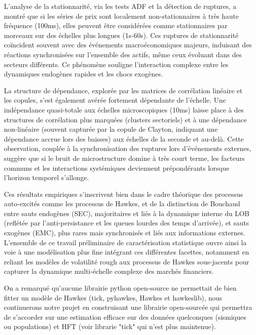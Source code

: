 \documentclass[10pt,a4paper]{article}
\theoremstyle{definition}
\theoremstyle{remark}
\begin{document}
\begin{itemize}
    \vspace{0.5cm}

    L'analyse de la stationnarité, via les tests ADF et la détection de ruptures, a montré que si les séries de prix sont localement non-stationnaires à très haute fréquence (100ms), elles peuvent être considérées comme stationnaires par morceaux sur des échelles plus longues (1s-60s). Ces ruptures de stationnarité coïncident souvent avec des événements macroéconomiques majeurs, induisant des réactions synchronisées sur l'ensemble des actifs, même ceux évoluant dans des secteurs différents. Ce phénomène souligne l'interaction complexe entre les dynamiques endogènes rapides et les chocs exogènes.

    \vspace{0.5cm}

    La structure de dépendance, explorée par les matrices de corrélation linéaire et les copules, s'est également avérée fortement dépendante de l'échelle. Une indépendance quasi-totale aux échelles microscopiques (10ms) laisse place à des structures de corrélation plus marquées (clusters sectoriels) et à une dépendance non-linéaire (souvent capturée par la copule de Clayton, indiquant une dépendance accrue lors des baisses) aux échelles de la seconde et au-delà. Cette observation, couplée à la synchronisation des ruptures lors d'événements externes, suggère que si le bruit de microstructure domine à très court terme, les facteurs communs et les interactions systémiques deviennent prépondérants lorsque l'horizon temporel s'allonge.

    \vspace{0.5cm}

    Ces résultats empiriques s'inscrivent bien dans le cadre théorique des processus auto-excités comme les processus de Hawkes, et de la distinction de Bouchaud entre sauts endogènes (SEC), majoritaires et liés à la dynamique interne du LOB (reflétée par l'anti-persistance et les queues lourdes des temps d'arrivée), et sauts exogènes (EMC), plus rares mais synchronisés et liés aux informations externes. L'ensemble de ce travail préliminaire de caractérisation statistique ouvre ainsi la voie à une modélisation plus fine intégrant ces différentes facettes, notamment en reliant les modèles de volatilité rough aux processus de Hawkes sous-jacents pour capturer la dynamique multi-échelle complexe des marchés financiers.

    \vspace{0.5cm}

    On a remarqué qu'aucune librairie python open-source ne permettait de bien fitter un modèle de Hawkes (tick, pyhawkes, Hawkes et hawkeslib), nous continuerons notre projet en construisant une librairie open-sourcée qui permettra de s'accorder sur une estimation efficace sur des données quelconques (sismiques ou populations) et HFT (voir librarie "tick" qui n'est plus maintenue).


\end{itemize}
\end{document}
